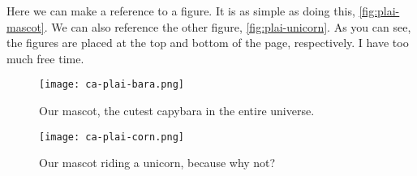 Here we can make a reference to a figure.
It is as simple as doing this, \autoref{fig:plai-mascot}.
We can also reference the other figure, \autoref{fig:plai-unicorn}.
As you can see, the figures are placed at the top and bottom of the page, respectively.
I have too much free time.

\lipsum[1-5]

\begin{figure}[t]
    \begin{center}
        \texttt{[image: ca-plai-bara.png]}
    \end{center}
    \caption{Our mascot, the cutest capybara in the entire universe.}
    \label{fig:plai-mascot}
\end{figure}

\begin{figure}[t]
    \begin{center}
        \texttt{[image: ca-plai-corn.png]}
    \end{center}
    \caption{Our mascot riding a unicorn, because why not?}
    \label{fig:plai-unicorn}
\end{figure}
